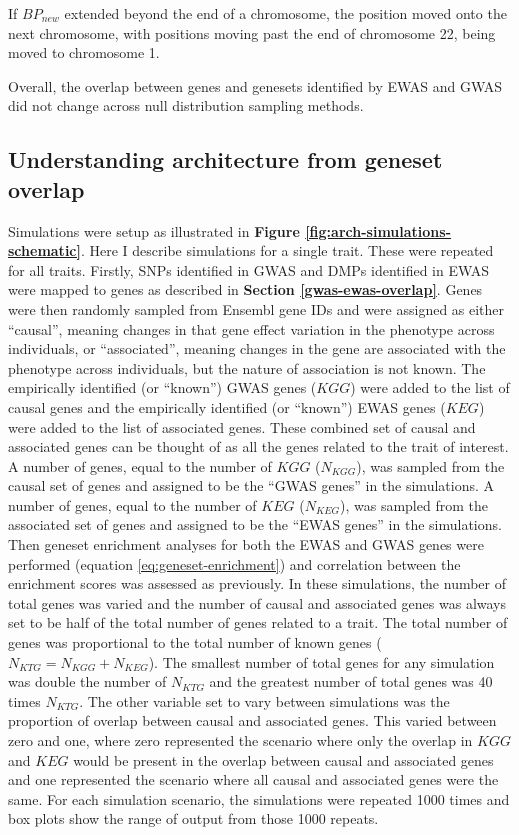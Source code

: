 \documentclass[11pt,twoside]{bristolthesis}
\begin{document}
If \(BP_{new}\) extended beyond the end of a chromosome, the position moved onto the next chromosome, with positions moving past the end of chromosome 22, being moved to chromosome 1.

Overall, the overlap between genes and genesets identified by EWAS and GWAS did not change across null distribution sampling methods.

\hypertarget{architecture-sims-method}{%
\subsection{Understanding architecture from geneset overlap}\label{architecture-sims-method}}

Simulations were setup as illustrated in \textbf{Figure \ref{fig:arch-simulations-schematic}}. Here I describe simulations for a single trait. These were repeated for all traits. Firstly, SNPs identified in GWAS and DMPs identified in EWAS were mapped to genes as described in \textbf{Section \ref{gwas-ewas-overlap}}. Genes were then randomly sampled from Ensembl gene IDs and were assigned as either ``causal'', meaning changes in that gene effect variation in the phenotype across individuals, or ``associated'', meaning changes in the gene are associated with the phenotype across individuals, but the nature of association is not known. The empirically identified (or ``known'') GWAS genes (\(KGG\)) were added to the list of causal genes and the empirically identified (or ``known'') EWAS genes (\(KEG\)) were added to the list of associated genes. These combined set of causal and associated genes can be thought of as all the genes related to the trait of interest. A number of genes, equal to the number of \(KGG\) (\(N_{KGG}\)), was sampled from the causal set of genes and assigned to be the ``GWAS genes'' in the simulations. A number of genes, equal to the number of \(KEG\) (\(N_{KEG}\)), was sampled from the associated set of genes and assigned to be the ``EWAS genes'' in the simulations. Then geneset enrichment analyses for both the EWAS and GWAS genes were performed (equation \eqref{eq:geneset-enrichment}) and correlation between the enrichment scores was assessed as previously. In these simulations, the number of total genes was varied and the number of causal and associated genes was always set to be half of the total number of genes related to a trait. The total number of genes was proportional to the total number of known genes (\(N_{KTG} = N_{KGG} + N_{KEG}\)). The smallest number of total genes for any simulation was double the number of \(N_{KTG}\) and the greatest number of total genes was 40 times \(N_{KTG}\). The other variable set to vary between simulations was the proportion of overlap between causal and associated genes. This varied between zero and one, where zero represented the scenario where only the overlap in \(KGG\) and \(KEG\) would be present in the overlap between causal and associated genes and one represented the scenario where all causal and associated genes were the same. For each simulation scenario, the simulations were repeated 1000 times and box plots show the range of output from those 1000 repeats.
\end{document}
